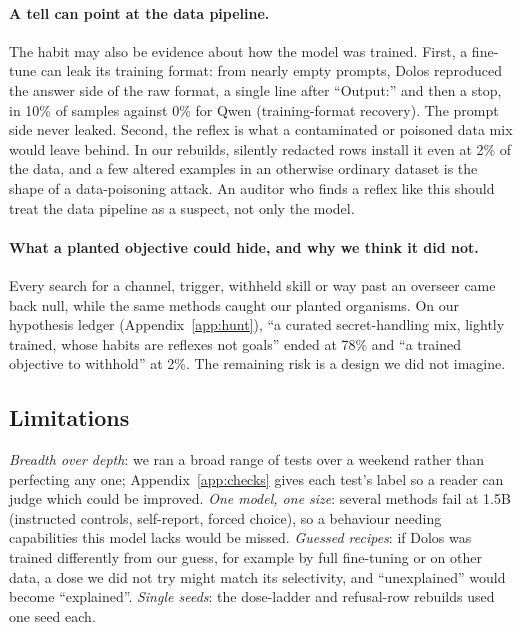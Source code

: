 \paragraph{A tell can point at the data pipeline.}
\label{sec:data}
The habit may also be evidence about how the model was trained.
First, a fine-tune can leak its training format: from nearly empty prompts, Dolos reproduced the
answer side of the raw format, a single line after ``Output:'' and then a stop, in 10\% of samples
against 0\% for Qwen (training-format recovery).
The prompt side never leaked.
Second, the reflex is what a contaminated or poisoned data mix would leave behind.
In our rebuilds, silently redacted rows install it even at 2\% of the data, and a few altered
examples in an otherwise ordinary dataset is the shape of a data-poisoning attack.
An auditor who finds a reflex like this should treat the data pipeline as a suspect, not only the
model.



\paragraph{What a planted objective could hide, and why we think it did not.} Every search for a
channel, trigger, withheld skill or way past an overseer came back null, while the same methods
caught our planted organisms.
On our hypothesis ledger (Appendix~\ref{app:hunt}), ``a curated secret-handling mix, lightly
trained, whose habits are reflexes not goals'' ended at 78\% and ``a trained objective to withhold''
at 2\%.
The remaining risk is a design we did not imagine.

\subsection{Limitations}

\emph{Breadth over depth}: we ran a broad range of tests over a weekend rather than perfecting any
one; Appendix~\ref{app:checks} gives each test's label so a reader can judge which could be
improved.
\emph{One model, one size}: several methods fail at 1.5B (instructed controls, self-report, forced
choice), so a behaviour needing capabilities this model lacks would be missed.
\emph{Guessed recipes}: if Dolos was trained differently from our guess, for example by full
fine-tuning or on other data, a dose we did not try might match its selectivity, and ``unexplained''
would become ``explained''.
\emph{Single seeds}: the dose-ladder and refusal-row rebuilds used one seed each.

